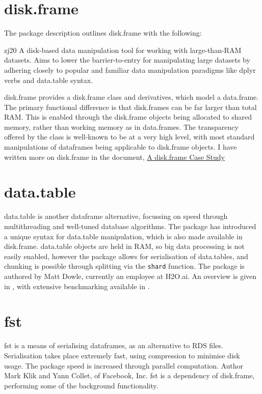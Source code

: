 \documentclass[10pt,a4paper]{article}
\begin{document}
\section{disk.frame}
\label{sec:disk.frame}

The package description outlines disk.frame with the following:

\begin{displaycquote}{zj20}
	A disk-based data manipulation tool for working with large-than-RAM
	datasets. Aims to lower the barrier-to-entry for manipulating large
	datasets by adhering closely to popular and familiar data
	manipulation paradigms like dplyr verbs and data.table syntax.
\end{displaycquote}

disk.frame provides a disk.frame class and derivatives, which model a
data.frame. The primary functional difference is that disk.frames can
be far larger than total RAM. This is enabled through the disk.frame
objects being allocated to shared memory, rather than working memory
as in data.frames. The transparency offered by the class is well-known
to be at a very high level, with most standard manipulations of
dataframes being applicable to disk.frame objects. I have written more
on disk.frame in the document, \href{case-study-disk.frame.pdf}{A
	disk.frame Case Study}

\section{data.table}
\label{sec:data.table}

data.table is another dataframe alternative, focussing on speed
through multithreading and well-tuned database
algorithms\cite{dowle19}. The package has introduced a unique syntax
for data.table manipulation, which is also made available in
disk.frame. data.table objects are held in RAM, so big data processing
is not easily enabled, however the package allows for serialisation of
data.tables, and chunking is possible through splitting via the
\texttt{shard} function. The package is authored by Matt Dowle,
currently an employee at H2O.ai. An overview is given in
\textcite{dowle19:_introd}, with extensive benchmarking available in
\textcite{dowle19:_bench}.

\section{fst}
\label{sec:fst}

fst is a means of serialising dataframes, as an alternative to RDS
files\cite{klik19}. Serialisation takes place extremely fast, using compression to
minimise disk usage. The package speed is increased through parallel
computation. Author Mark Klik and Yann Collet, of Facebook, Inc. fst
is a dependency of disk.frame, performing some of the background
functionality.
\end{document}
